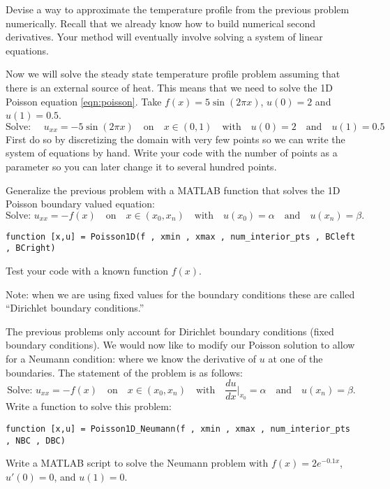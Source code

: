\begin{problem}
    Devise a way to approximate the temperature profile from the previous problem
    numerically.  Recall that we already know how to build numerical second derivatives.
    Your method will eventually involve solving a system of linear equations.
\end{problem}

\begin{problem}
    Now we will solve the steady state temperature profile problem assuming that there is
    an external source of heat.  This means that we need to solve the 1D Poisson equation
    \eqref{eqn:poisson}.  Take $f(x) = 5\sin(2 \pi x)$, $u(0) = 2$ and $u(1) = 0.5$.
    \[ \text{Solve: } \quad u_{xx} = -5\sin(2\pi x) \quad \text{on} \quad x \in (0,1)
    \quad \text{with} \quad u(0)=2 \quad \text{and} \quad u(1) = 0.5 \]
    First do so by discretizing the domain with very few points so we can write the system
    of equations by hand.  Write your code with the number of points as a parameter so you
    can later change it to several hundred points.
\end{problem}

\begin{problem}
    Generalize the previous problem with a MATLAB function that solves the 1D Poisson
    boundary valued equation:
    \[ \text{Solve: } u_{xx} = - f(x) \quad \text{on} \quad x \in (x_0,x_n) \quad \text{with} \quad
    u(x_0) = \alpha \quad \text{and} \quad u(x_n) = \beta. \]
\begin{verbatim}
function [x,u] = Poisson1D(f , xmin , xmax , num_interior_pts , BCleft , BCright)
\end{verbatim}
    Test your code with a known function $f(x)$.

    Note: when we are using fixed values for the boundary conditions these are called
    ``Dirichlet boundary conditions.''
\end{problem}



\begin{problem}
The previous problems only account for Dirichlet boundary conditions (fixed boundary
conditions).  We would now like to modify our Poisson solution to allow for a Neumann
condition: where we know the derivative of $u$ at one of the boundaries.  The
statement of the problem is as follows:
    \[ \text{Solve: } u_{xx} = - f(x) \quad \text{on} \quad x \in (x_0,x_n) \quad \text{with} \quad
    \frac{du}{dx}\Big|_{x_0} = \alpha \quad \text{and} \quad u(x_n) = \beta. \]
    Write a function to solve this problem:
\begin{verbatim}
function [x,u] = Poisson1D_Neumann(f , xmin , xmax , num_interior_pts , NBC , DBC)
\end{verbatim}

    Write a MATLAB script to solve the Neumann problem with $f(x) = 2e^{-0.1x}$, $u'(0)=0$,
    and $u(1)=0$.
\end{problem}

